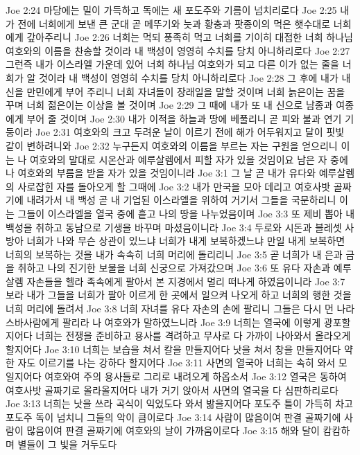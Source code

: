 Joe 2:24  마당에는 밀이 가득하고 독에는 새 포도주와 기름이 넘치리로다
Joe 2:25  내가 전에 너희에게 보낸 큰 군대 곧 메뚜기와 늣과 황충과 팟종이의 먹은 햇수대로 너희에게 갚아주리니
Joe 2:26  너희는 먹되 풍족히 먹고 너희를 기이히 대접한 너희 하나님 여호와의 이름을 찬송할 것이라 내 백성이 영영히 수치를 당치 아니하리로다
Joe 2:27  그런즉 내가 이스라엘 가운데 있어 너희 하나님 여호와가 되고 다른 이가 없는 줄을 너희가 알 것이라 내 백성이 영영히 수치를 당치 아니하리로다
Joe 2:28  그 후에 내가 내 신을 만민에게 부어 주리니 너희 자녀들이 장래일을 말할 것이며 너희 늙은이는 꿈을 꾸며 너희 젊은이는 이상을 볼 것이며
Joe 2:29  그 때에 내가 또 내 신으로 남종과 여종에게 부어 줄 것이며
Joe 2:30  내가 이적을 하늘과 땅에 베풀리니 곧 피와 불과 연기 기둥이라
Joe 2:31  여호와의 크고 두려운 날이 이르기 전에 해가 어두워지고 달이 핏빛 같이 변하려니와
Joe 2:32  누구든지 여호와의 이름을 부르는 자는 구원을 얻으리니 이는 나 여호와의 말대로 시온산과 예루살렘에서 피할 자가 있을 것임이요 남은 자 중에 나 여호와의 부름을 받을 자가 있을 것임이니라
Joe 3:1  그 날 곧 내가 유다와 예루살렘의 사로잡힌 자를 돌아오게 할 그때에
Joe 3:2  내가 만국을 모아 데리고 여호사밧 골짜기에 내려가서 내 백성 곧 내 기업된 이스라엘을 위하여 거기서 그들을 국문하리니 이는 그들이 이스라엘을 열국 중에 흩고 나의 땅을 나누었음이며
Joe 3:3  또 제비 뽑아 내 백성을 취하고 동남으로 기생을 바꾸며 마셨음이니라
Joe 3:4  두로와 시돈과 블레셋 사방아 너희가 나와 무슨 상관이 있느냐 너희가 내게 보복하겠느냐 만일 내게 보복하면 너희의 보복하는 것을 내가 속속히 너희 머리에 돌리리니
Joe 3:5  곧 너희가 내 은과 금을 취하고 나의 진기한 보물을 너희 신궁으로 가져갔으며
Joe 3:6  또 유다 자손과 예루살렘 자손들을 헬라 족속에게 팔아서 본 지경에서 멀리 떠나게 하였음이니라
Joe 3:7  보라 내가 그들을 너희가 팔아 이르게 한 곳에서 일으켜 나오게 하고 너희의 행한 것을 너희 머리에 돌려서
Joe 3:8  너희 자녀를 유다 자손의 손에 팔리니 그들은 다시 먼 나라 스바사람에게 팔리라 나 여호와가 말하였느니라
Joe 3:9  너희는 열국에 이렇게 광포할지어다 너희는 전쟁을 준비하고 용사를 격려하고 무사로 다 가까이 나아와서 올라오게 할지어다
Joe 3:10  너희는 보습을 쳐서 칼을 만들지어다 낫을 쳐서 창을 만들지어다 약한 자도 이르기를 나는 강하다 할지어다
Joe 3:11  사면의 열국아 너희는 속히 와서 모일지어다 여호와여 주의 용사들로 그리로 내려오게 하옵소서
Joe 3:12  열국은 동하여 여호사밧 골짜기로 올라올지어다 내가 거기 앉아서 사면의 열국을 다 심판하리로다
Joe 3:13  너희는 낫을 쓰라 곡식이 익었도다 와서 밞을지어다 포도주 틀이 가득히 차고 포도주 독이 넘치니 그들의 악이 큼이로다
Joe 3:14  사람이 많음이여 판결 골짜기에 사람이 많음이여 판결 골짜기에 여호와의 날이 가까움이로다
Joe 3:15  해와 달이 캄캄하며 별들이 그 빛을 거두도다
